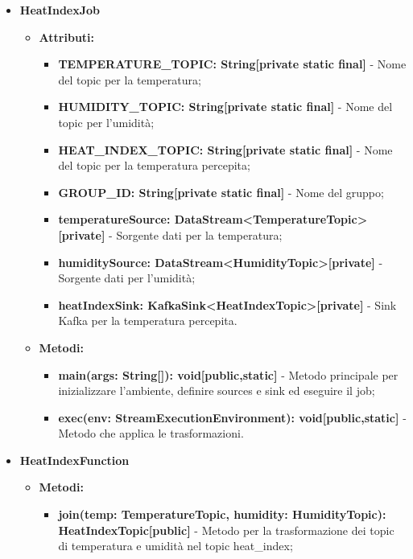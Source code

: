 \documentclass[8pt]{article}
\begin{document}
\begin{itemize}
    \item \textbf{HeatIndexJob}
    \begin{itemize}
        \item \textbf{Attributi:}
        \begin{itemize}
            \item \textbf{TEMPERATURE\_TOPIC: String[private static final]} - Nome del topic per la temperatura;
            \item \textbf{HUMIDITY\_TOPIC: String[private static final]} - Nome del topic per l'umidità;
            \item \textbf{HEAT\_INDEX\_TOPIC: String[private static final]} - Nome del topic per la temperatura percepita;
            \item \textbf{GROUP\_ID: String[private static final]} - Nome del gruppo;
            \item \textbf{temperatureSource: DataStream<TemperatureTopic>[private]} - Sorgente dati per la temperatura;
            \item \textbf{humiditySource: DataStream<HumidityTopic>[private]} - Sorgente dati per l'umidità;
            \item \textbf{heatIndexSink: KafkaSink<HeatIndexTopic>[private]} - Sink Kafka per la temperatura percepita.
        \end{itemize}
    \end{itemize}
    \begin{itemize}
        \item \textbf{Metodi:}
        \begin{itemize}
            \item \textbf{main(args: String[]): void[public,static]} - Metodo principale per inizializzare l'ambiente, definire sources e sink ed eseguire il job;
            \item \textbf{exec(env: StreamExecutionEnvironment): void[public,static]} - Metodo che applica le trasformazioni.
        \end{itemize}
    \end{itemize}
    \item \textbf{HeatIndexFunction}
    \begin{itemize}
        \item \textbf{Metodi:}
        \begin{itemize}
            \item \textbf{join(temp: TemperatureTopic, humidity: HumidityTopic): HeatIndexTopic[public]} - Metodo per la trasformazione dei topic di temperatura e umidità nel topic heat\_index;

\end{itemize}
\end{itemize}
\end{itemize}
\end{document}
